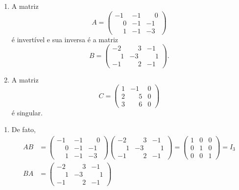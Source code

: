 \begin{exemplos}
    \begin{enumerate}
        \item A matriz
        \[
           A = \begin{pmatrix}
                -1 & -1 & \phantom{-}0\\
                \phantom{-}0 & -1 & -1\\
                \phantom{-}1 & -1 & -3
            \end{pmatrix}
        \]
        é invertível e sua inversa é a matriz
        \[
           B = \begin{pmatrix}
                -2 & \phantom{-}3 & -1\\
                \phantom{-}1 & -3 & \phantom{-}1\\
                -1 & \phantom{-}2 & -1
            \end{pmatrix}.
        \]
        \item A matriz
        \[
            C = \begin{pmatrix}1 & -1 & 0\\2 & \phantom{-}5 & 0\\3 & \phantom{-}6 & 0\end{pmatrix}
        \]
        é singular.
    \end{enumerate}
    \begin{solucao}
        \begin{enumerate}
            \item De fato,
            \begin{align*}
                AB &= \begin{pmatrix} -1 & -1 &\phantom{-} 0\\ \phantom{-}0 & -1 & -1\\ \phantom{-}1 & -1 & -3\end{pmatrix}
                \begin{pmatrix}-2 & \phantom{-}3 & -1\\ \phantom{-}1 & -3 & \phantom{-}1\\ -1 & \phantom{-}2 & -1\end{pmatrix} =
                \begin{pmatrix} 1 & 0 & 0\\ 0 & 1 & 0\\ 0 & 0 & 1\end{pmatrix} = I_3\\
                BA &= \begin{pmatrix}-2 & \phantom{-}3 & -1\\ \phantom{-}1 & -3 & \phantom{-}1\\ -1 & \phantom{-}2 & -1\end{pmatrix}

\end{align*}
\end{enumerate}
\end{solucao}
\end{exemplos}
